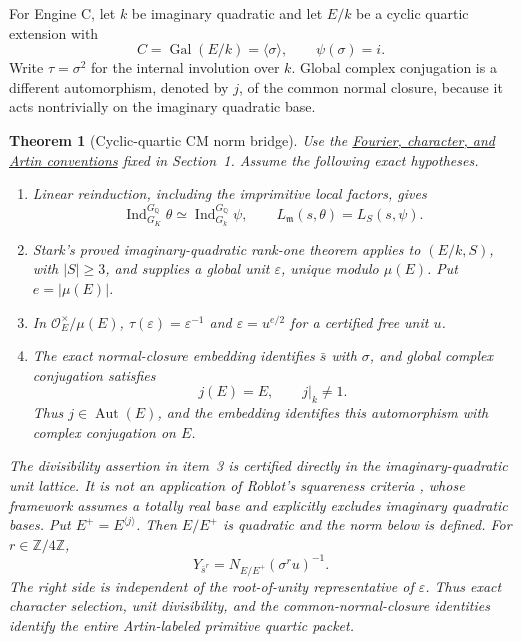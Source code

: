 \documentclass[11pt]{article}
\newtheorem{theorem}{Theorem}
\newcommand{\Q}{\mathbb Q}
\newcommand{\Z}{\mathbb Z}
\newcommand{\Gal}{\operatorname{Gal}}
\begin{document}
For Engine C, let \(k\) be imaginary quadratic and let \(E/k\) be a
cyclic quartic extension with
\[
 C=\Gal(E/k)=\langle\sigma\rangle,\qquad \psi(\sigma)=i.
\]
Write \(\tau=\sigma^2\) for the internal involution over \(k\).
Global complex conjugation is a different automorphism, denoted by
\(j\), of the common normal closure, because it acts nontrivially on
the imaginary quadratic base.

\begin{theorem}[Cyclic-quartic CM norm bridge]\label{thm:cmbridge}
Use the \hyperref[par:conventions]{Fourier, character, and Artin
conventions} fixed in Section~1.  Assume the following exact
hypotheses.
\begin{enumerate}
\item Linear reinduction, including the imprimitive local factors,
gives
\begin{equation}\label{eq:reinduction}
 \operatorname{Ind}_{G_K}^{G_\Q}\theta
 \simeq\operatorname{Ind}_{G_k}^{G_\Q}\psi,
 \qquad
 L_{\mathfrak m}(s,\theta)=L_S(s,\psi).
\end{equation}
\item Stark's proved imaginary-quadratic rank-one theorem applies to
\((E/k,S)\), with \(|S|\ge3\), and supplies a global unit
\(\varepsilon\), unique modulo \(\mu(E)\).  Put
\(e=|\mu(E)|\).
\item In \(\mathcal O_E^\times/\mu(E)\),
\(\tau(\varepsilon)=\varepsilon^{-1}\) and
\(\varepsilon=u^{e/2}\) for a certified free unit \(u\).
\item The exact normal-closure embedding identifies \(\bar s\) with
\(\sigma\), and global complex conjugation satisfies
\[
 j(E)=E,\qquad j|_k\ne1.
\]
Thus \(j\in\operatorname{Aut}(E)\), and the embedding identifies this
automorphism with complex conjugation on \(E\).
\end{enumerate}
The divisibility assertion in item~3 is certified directly in the
imaginary-quadratic unit lattice.  It is not an application of
Roblot's squareness criteria \cite[Cor.~2.4 and
Thms.~6.2, 7.2]{Roblot2013}, whose framework assumes a totally real
base and explicitly excludes imaginary quadratic bases.
Put \(E^+=E^{\langle j\rangle}\).  Then \(E/E^+\) is quadratic and
the norm below is defined.  For \(r\in\Z/4\Z\),
\begin{equation}\label{eq:cm-norm-bridge}
 \boxed{\qquad
 Y_{\bar s^r}
 =N_{E/E^+}(\sigma^ru)^{-1}.
 \qquad}
\end{equation}
The right side is independent of the root-of-unity representative of
\(\varepsilon\).  Thus exact character selection, unit divisibility,
and the common-normal-closure identities identify the entire
Artin-labeled primitive quartic packet.
\end{theorem}
\end{document}
